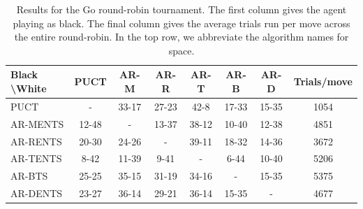         \begin{table}[]
        \centering   
		    \begin{tabular}{l|cccccc|c} 
		        \textbf{Black \textbackslash White}     & PUCT  & AR-M  & AR-R  & AR-T  & AR-B  & AR-D   & Trials/move\\ 
		        \hline
		                                PUCT            &   -   & 33-17 & 27-23 & 42-8  & 17-33 & 15-35  & 1054 \\
		                                AR-MENTS        & 12-48 &   -   & 13-37 & 38-12 & 10-40 & 12-38  & 4851\\
		                                AR-RENTS        & 20-30 & 24-26 &   -   & 39-11 & 18-32 & 14-36  & 3672 \\
		                                AR-TENTS        &  8-42 & 11-39 &  9-41 &   -   &  6-44 & 10-40  & 5206 \\
		                                AR-BTS          & 25-25 & 35-15 & 31-19 & 34-16 &   -   & 15-35  & 5375 \\
		                                AR-DENTS        & 23-27 & 36-14 & 29-21 & 36-14 & 15-35 &   -    & 4677 \\         
		    \end{tabular}
            \caption{Results for the Go round-robin tournament. The first column gives the agent playing as black. The final column gives the average trials run per move across the entire round-robin. In the top row, we abbreviate the algorithm names for space.\label{table:go_results}}
        \end{table}



































        
            
            
            
            
            






























